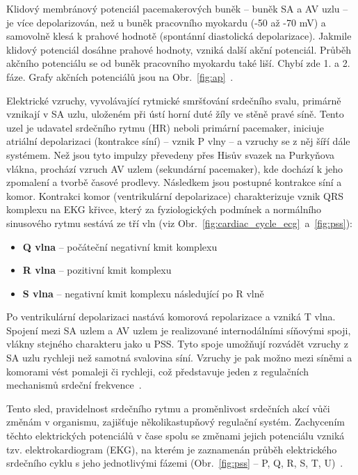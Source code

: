 Klidový membránový potenciál pacemakerových buněk -- buněk SA a AV uzlu -- je
více depolarizován, než u buněk pracovního myokardu (-50 až -70 mV) a samovolně
klesá k prahové hodnotě (spontánní diastolická depolarizace). Jakmile klidový
potenciál dosáhne prahové hodnoty, vzniká další akční potenciál. Průběh akčního
potenciálu se od buněk pracovního myokardu také liší. Chybí zde 1. a 2. fáze.
Grafy akčních potenciálů jsou na Obr.~\ref{fig:ap}~\cite{Petrek2019}.

Elektrické vzruchy, vyvolávající rytmické smršťování srdečního svalu, primárně
vznikají v SA uzlu, uloženém při ústí horní duté žíly ve stěně pravé síně. Tento
uzel je udavatel srdečního rytmu (HR) neboli primární pacemaker, iniciuje
atriální depolarizaci (kontrakce síní) -- vznik P vlny -- a vzruchy se z něj
šíří dále systémem. Než jsou tyto impulzy převedeny přes Hisův svazek na
Purkyňova vlákna, prochází vzruch AV uzlem (sekundární pacemaker), kde dochází k
jeho zpomalení a tvorbě časové prodlevy. Následkem jsou postupné kontrakce síní
a komor. Kontrakci komor (ventrikulární depolarizace) charakterizuje vznik QRS
komplexu na EKG křivce, který za fyziologických podmínek a normálního sinusového
rytmu sestává ze tří vln (viz Obr.~\ref{fig:cardiac_cycle_ecg}~a~\ref{fig:pss}):
\begin{itemize}[noitemsep]
	\item \textbf{Q vlna} -- počáteční negativní kmit komplexu
	\item \textbf{R vlna} -- pozitivní kmit komplexu
	\item \textbf{S vlna} -- negativní kmit komplexu následující po R vlně
\end{itemize}

Po ventrikulární depolarizaci nastává komorová repolarizace a vzniká T vlna.
Spojení mezi SA uzlem a AV uzlem je realizované internodálními síňovými spoji,
vlákny stejného charakteru jako u PSS. Tyto spoje umožňují rozvádět vzruchy z SA
uzlu rychleji než samotná svalovina síní. Vzruchy je pak možno mezi síněmi a
komorami vést pomaleji či rychleji, což představuje jeden z regulačních
mechanismů srdeční frekvence~\cite{Dylevsky2013,Cihak2016}.

Tento sled, pravidelnost srdečního rytmu a proměnlivost srdečních akcí vůči
změnám v organismu, zajišťuje několikastupňový regulační systém. Zachycením
těchto elektrických potenciálů v čase spolu se změnami jejich potenciálu vzniká
tzv. elektrokardiogram (EKG), na kterém je zaznamenán průběh elektrického
srdečního cyklu s jeho jednotlivými fázemi (Obr.~\ref{fig:pss} -- P, Q, R, S, T,
U)~\cite{Dylevsky2013,Cihak2016}.


